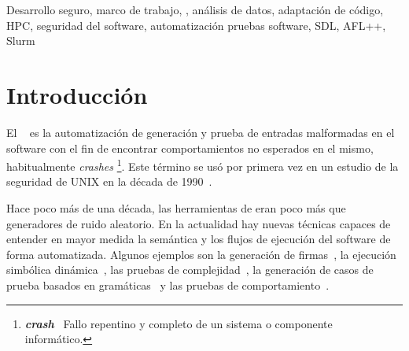 \documentclass[10pt,conference,a4paper]{IEEEtran}
\begin{document}
\begin{IEEEkeywords}
Desarrollo seguro, marco de trabajo, {\fz}, análisis de datos, adaptación de código, HPC, seguridad del software, automatización pruebas software, SDL, AFL++, Slurm
\end{IEEEkeywords}


\section{Introducción}

%




El {\fz}~\cite{contexto_fuzzing} es la automatización de generación y prueba de entradas malformadas en el software con el fin de encontrar comportamientos no esperados en el mismo, habitualmente \textit{crashes}%
\footnote{\textbf{\textit{crash}}~\cite{IEEE_SW_standar}
Fallo repentino y completo de un sistema o componente informático.
}. %
Este término se usó por primera vez en un estudio de la seguridad de UNIX en la década de 1990~\cite{inicio_fuzzing,continuacion_fuzzing}.

Hace poco más de una década, las herramientas de {\fz} eran poco más que generadores de ruido aleatorio. En la actualidad hay nuevas técnicas capaces de entender en mayor medida la semántica y los flujos de ejecución del software de forma automatizada. Algunos ejemplos son la generación de firmas~\cite{fuzz_evo-tec-firma}, la ejecución simbólica dinámica~\cite{fuzz_evo-tec-ejec_simbolica_dina}, las pruebas de complejidad~\cite{fuzz_evo-tec-complex}, la generación de casos de prueba basados en gramáticas~\cite{fuzz_evo-tec-gem_tc_grama} y las pruebas de comportamiento~\cite{fuzz_evo-tec-comportamiento}. 
\end{document}
